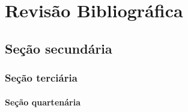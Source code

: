 
\chapter{Revisão Bibliográfica} \label{ch:rev-biliografica}

\lipsum[1]

\section{Seção secundária} \label{sec:secundaria}

\lipsum[1]

\subsection{Seção terciária} \label{subsec:terciaria}

\lipsum[1]

\subsubsection{Seção quartenária} \label{subsec:quartenaria}

\lipsum[1]


